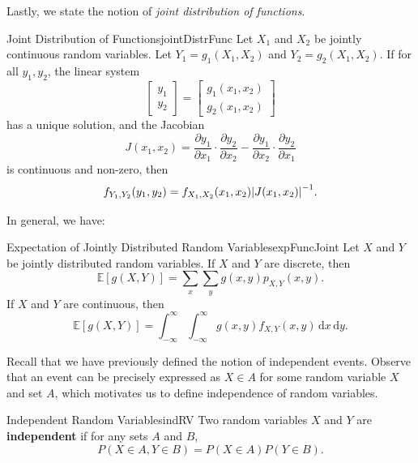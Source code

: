 \documentclass[math]{amznotes}
\theoremstyle{remark}
\newcommand{\0}{\mathbf{0}}
\newcommand{\1}{\mathbf{1}}
\begin{document}
Lastly, we state the notion of \textit{joint distribution of functions}.
\begin{probox}{Joint Distribution of Functions}{jointDistrFunc}
    Let $X_1$ and $X_2$ be jointly continuous random variables. Let $Y_1 = g_1(X_1, X_2)$ and $Y_2 = g_2(X_1, X_2)$. If for all $y_1, y_2$, the linear system
    \begin{equation*}
        \begin{bmatrix}
            y_1 \\
            y_2
        \end{bmatrix} = \begin{bmatrix}
            g_1(x_1, x_2) \\
            g_2(x_1, x_2)
        \end{bmatrix}
    \end{equation*}
    has a unique solution, and the Jacobian
    \begin{equation*}
        J(x_1, x_2) = \frac{\partial y_1}{\partial x_1}\cdot\frac{\partial y_2}{\partial x_2} - \frac{\partial y_1}{\partial x_2}\cdot \frac{\partial y_2}{\partial x_1}
    \end{equation*}
    is continuous and non-zero, then
    \begin{equation*}
        f_{Y_1, Y_2}(y_1, y_2) = f_{X_1, X_2}(x_1, x_2){\left\lvert {J(x_1, x_2)} \right\rvert}^{-1}.
    \end{equation*}
\end{probox}
In general, we have:
\begin{probox}{Expectation of Jointly Distributed Random Variables}{expFuncJoint}
    Let $X$ and $Y$ be jointly distributed random variables. If $X$ and $Y$ are discrete, then 
    \begin{equation*}
        \mathbb{E}[g(X, Y)] = \sum_{x}\sum_{y}g(x, y)p_{X, Y}(x, y).
    \end{equation*}
    If $X$ and $Y$ are continuous, then 
    \begin{equation*}
        \mathbb{E}[g(X, Y)] = \int_{-\infty}^{\infty}\int_{-\infty}^{\infty}\!g(x, y)f_{X, Y}(x, y)\,\mathrm{d}x\,\mathrm{d}y.
    \end{equation*}
\end{probox}
Recall that we have previously defined the notion of independent events. Observe that an event can be precisely expressed as $X \in A$ for some random variable $X$ and set $A$, which motivates us to define independence of random variables.
\begin{dfnbox}{Independent Random Variables}{indRV}
    Two random variables $X$ and $Y$ are {\color{red} \textbf{independent}} if for any sets $A$ and $B$,
    \begin{equation*}
        P(X \in A, Y \in B) = P(X \in A)P(Y \in B).
    \end{equation*}
\end{dfnbox}
\end{document}

